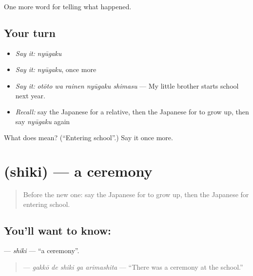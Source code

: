\begin{grammarlens}[title={What you've built}]
One more word for telling what happened.
\end{grammarlens}

\subsection*{Your turn}
\begin{itemize}
\raggedright
  \item \emph{Say it:} \emph{nyūgaku}
  \item \emph{Say it:} \emph{nyūgaku}, once more
  \item \emph{Say it:} \emph{otōto wa rainen nyūgaku shimasu} — My little brother starts school next year.
  \item \emph{Recall:} say the Japanese for a relative, then the Japanese for to grow up, then say \emph{nyūgaku} again
\end{itemize}

\begin{tcolorbox}[breakable,colback=teal!4,colframe=teal!35!black,title={Before you move on}]
What does  mean? (\textquotedblleft{}Entering school\textquotedblright{}.) Say it once more.
\end{tcolorbox}
\section[\texorpdfstring{\ja{しき} (shiki)}{しき (shiki)}]{ (shiki) — a ceremony}

\label{lesson:JA-C288-shiki}



\begin{quote}
Before the new one: say the Japanese for to grow up, then the Japanese for entering school.
\end{quote}

\subsection*{You'll want to know: }
\textbf{} — \emph{shiki} — \textquotedblleft{}a ceremony\textquotedblright{}.

\begin{quote}
\textbf{  } — \emph{gakkō de shiki ga arimashita} — \textquotedblleft{}There was a ceremony at the school.\textquotedblright{}
\end{quote}

